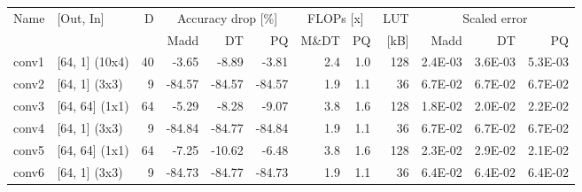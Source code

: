 \begin{table}
\centering
\begin{tabular}{llrrrrrrrrrr}
\toprule
Name & [Out, In] & D & \multicolumn{3}{|c|}{Accuracy drop [\%]} & \multicolumn{2}{|c|}{FLOPs [x]} & LUT & \multicolumn{3}{|c|}{Scaled error} \\
 &  &  & Madd & DT & PQ & M\&DT & PQ & [kB] & Madd & DT & PQ \\
\midrule
conv1 & [64, 1] (10x4) & 40 & {\cellcolor[HTML]{F1F9AC}} \color[HTML]{000000} -3.65 & {\cellcolor[HTML]{FEFFBE}} \color[HTML]{000000} -8.89 & {\cellcolor[HTML]{F2FAAE}} \color[HTML]{000000} -3.81 & 2.4 & 1.0 & 128 & {\cellcolor[HTML]{B7E075}} \color[HTML]{000000} 2.4E-03 & {\cellcolor[HTML]{BDE379}} \color[HTML]{000000} 3.6E-03 & {\cellcolor[HTML]{C5E67E}} \color[HTML]{000000} 5.3E-03 \\
conv2 & [64, 1] (3x3) & 9 & {\cellcolor[HTML]{A50026}} \color[HTML]{F1F1F1} -84.57 & {\cellcolor[HTML]{A50026}} \color[HTML]{F1F1F1} -84.57 & {\cellcolor[HTML]{A50026}} \color[HTML]{F1F1F1} -84.57 & 1.9 & 1.1 & 36 & {\cellcolor[HTML]{B30D26}} \color[HTML]{F1F1F1} 6.7E-02 & {\cellcolor[HTML]{B30D26}} \color[HTML]{F1F1F1} 6.7E-02 & {\cellcolor[HTML]{B30D26}} \color[HTML]{F1F1F1} 6.7E-02 \\
conv3 & [64, 64] (1x1) & 64 & {\cellcolor[HTML]{F5FBB2}} \color[HTML]{000000} -5.29 & {\cellcolor[HTML]{FDFEBC}} \color[HTML]{000000} -8.28 & {\cellcolor[HTML]{FFFEBE}} \color[HTML]{000000} -9.07 & 3.8 & 1.6 & 128 & {\cellcolor[HTML]{F8FCB6}} \color[HTML]{000000} 1.8E-02 & {\cellcolor[HTML]{FFFEBE}} \color[HTML]{000000} 2.0E-02 & {\cellcolor[HTML]{FFF7B2}} \color[HTML]{000000} 2.2E-02 \\
conv4 & [64, 1] (3x3) & 9 & {\cellcolor[HTML]{A50026}} \color[HTML]{F1F1F1} -84.84 & {\cellcolor[HTML]{A50026}} \color[HTML]{F1F1F1} -84.77 & {\cellcolor[HTML]{A50026}} \color[HTML]{F1F1F1} -84.84 & 1.9 & 1.1 & 36 & {\cellcolor[HTML]{B71126}} \color[HTML]{F1F1F1} 6.7E-02 & {\cellcolor[HTML]{B71126}} \color[HTML]{F1F1F1} 6.7E-02 & {\cellcolor[HTML]{B71126}} \color[HTML]{F1F1F1} 6.7E-02 \\
conv5 & [64, 64] (1x1) & 64 & {\cellcolor[HTML]{FBFDBA}} \color[HTML]{000000} -7.25 & {\cellcolor[HTML]{FFFCBA}} \color[HTML]{000000} -10.62 & {\cellcolor[HTML]{F8FCB6}} \color[HTML]{000000} -6.48 & 3.8 & 1.6 & 128 & {\cellcolor[HTML]{FFF5AE}} \color[HTML]{000000} 2.3E-02 & {\cellcolor[HTML]{FEE28F}} \color[HTML]{000000} 2.9E-02 & {\cellcolor[HTML]{FFFAB6}} \color[HTML]{000000} 2.1E-02 \\
conv6 & [64, 1] (3x3) & 9 & {\cellcolor[HTML]{A50026}} \color[HTML]{F1F1F1} -84.73 & {\cellcolor[HTML]{A50026}} \color[HTML]{F1F1F1} -84.77 & {\cellcolor[HTML]{A50026}} \color[HTML]{F1F1F1} -84.73 & 1.9 & 1.1 & 36 & {\cellcolor[HTML]{C21C27}} \color[HTML]{F1F1F1} 6.4E-02 & {\cellcolor[HTML]{C21C27}} \color[HTML]{F1F1F1} 6.4E-02 & {\cellcolor[HTML]{C21C27}} \color[HTML]{F1F1F1} 6.4E-02 \\

\end{tabular}
\end{table}
